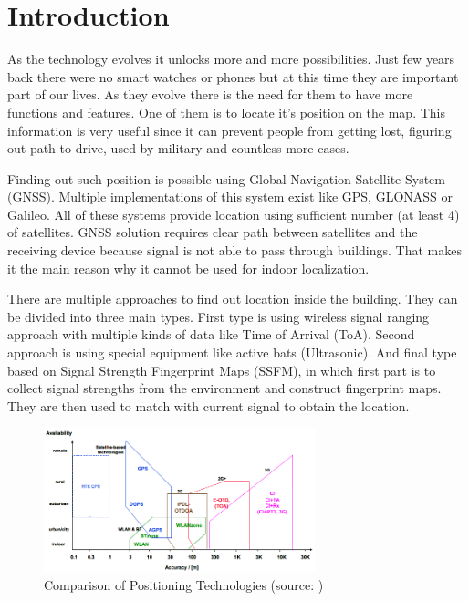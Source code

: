 \chapter{Introduction}\label{sec:Introduction}
\setcounter{page}{1}
As the technology evolves it unlocks more and more possibilities. Just few years back there were no smart watches or phones but at this time they are important part of our lives. As they evolve there is the need for them to have more functions and features. One of them is to locate it's position on the map. This information is very useful since it can prevent people from getting lost, figuring out path to drive, used by military and countless more cases.

Finding out such position is possible using Global Navigation Satellite System (GNSS). Multiple implementations of this system exist like GPS, GLONASS or Galileo. All of these systems provide location using sufficient number (at least 4) of satellites.\cite{GNSS} GNSS solution requires clear path between satellites and the receiving device because signal is not able to pass through buildings. That makes it the main reason why it cannot be used for indoor localization.

There are multiple approaches to find out location inside the building. They can be divided into three main types. First type is using wireless signal ranging approach with multiple kinds of data like Time of Arrival (ToA). Second approach is using special equipment like active bats (Ultrasonic). And final type based on Signal Strength Fingerprint Maps (SSFM), in which first part is to collect signal strengths from the environment and construct fingerprint maps. They are then used to match with current signal to obtain the location.\cite{LocalizationApproaches}

\begin{figure}[h!]
	\begin{centering}
		\includegraphics[width=0.7\textwidth]{img/1_comparison_of_positionin_technologies}
		\par\end{centering}
	\caption{Comparison of Positioning Technologies (source: \cite{PedestrianDeadReckoning})\label{fig:1_comparison_of_positionin_technologies}}
\end{figure}

